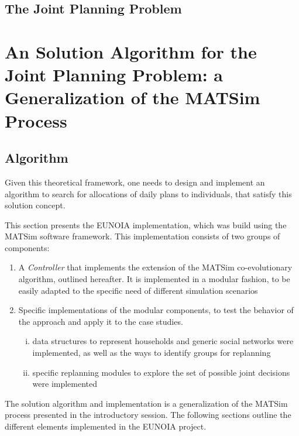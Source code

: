 {\subsection{The Joint Planning Problem}

\section{An Solution Algorithm for the Joint Planning Problem: a Generalization of the MATSim Process\label{sec:td:algo}}

\subsection{Algorithm}

Given this theoretical framework, one needs to design and implement an
algorithm to search for allocations of daily plans to individuals, that
satisfy this solution concept.

This section presents the EUNOIA implementation, which was build using
the MATSim software framework. This implementation consists of two
groups of components:

\begin{enumerate}
\item
  A \emph{Controller} that implements the extension of the MATSim
  co-evolutionary algorithm, outlined hereafter. It is implemented in a
  modular fashion, to be easily adapted to the specific need of
  different simulation scenarios
\item
  Specific implementations of the modular components, to test the
  behavior of the approach and apply it to the case studies.

  \begin{enumerate}[i)]
  \item
    data structures to represent households and generic social networks
    were implemented, as well as the ways to identify groups for
    replanning
  \item
    specific replanning modules to explore the set of possible joint
    decisions were implemented
  \end{enumerate}
\end{enumerate}

The solution algorithm and implementation is a generalization of the
MATSim process presented in the introductory session. The following
sections outline the different elements implemented in the EUNOIA
project.

}
